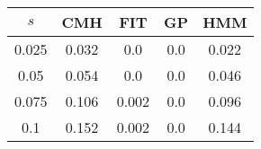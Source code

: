 \centering \begin{tabular}{c|c|c|c|c}
$s$	&CMH	&FIT	&GP	&HMM\\\hline
0.025	&0.032	&0.0	&0.0	&0.022\\
0.05	&0.054	&0.0	&0.0	&0.046\\
0.075	&0.106	&0.002	&0.0	&0.096\\
0.1	&0.152	&0.002	&0.0	&0.144\\
\end{tabular}
